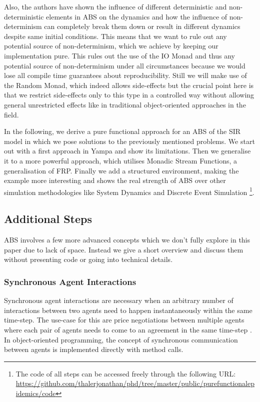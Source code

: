 Also, the authors \cite{thaler_art_2017} have shown the influence of different deterministic and non-deterministic elements in ABS on the dynamics and how the influence of non-determinism can completely break them down or result in different dynamics despite same initial conditions. This means that we want to rule out any potential source of non-determinism, which we achieve by keeping our implementation pure. This rules out the use of the IO Monad and thus any potential source of non-determinism under all circumstances because we would lose all compile time guarantees about reproducibility. Still we will make use of the Random Monad, which indeed allows side-effects but the crucial point here is that we restrict side-effects only to this type in a controlled way without allowing general unrestricted effects like in traditional object-oriented approaches in the field.

In the following, we derive a pure functional approach for an ABS of the SIR model in which we pose solutions to the previously mentioned problems. We start out with a first approach in Yampa and show its limitations. Then we generalise it to a more powerful approach, which utilises Monadic Stream Functions, a generalisation of FRP. Finally we add a structured environment, making the example more interesting and shows the real strength of ABS over other simulation methodologies like System Dynamics and Discrete Event Simulation \footnote{The code of all steps can be accessed freely through the following URL: \url{https://github.com/thalerjonathan/phd/tree/master/public/purefunctionalepidemics/code}}.







\subsection{Additional Steps}
ABS involves a few more advanced concepts which we don't fully explore in this paper due to lack of space. Instead we give a short overview and discuss them without presenting code or going into technical details.

\subsubsection{Synchronous Agent Interactions}
Synchronous agent interactions are necessary when an arbitrary number of interactions between two agents need to happen instantaneously within the same time-step. The use-case for this are price negotiations between multiple agents where each pair of agents needs to come to an agreement in the same time-step \cite{epstein_growing_1996}. In object-oriented programming, the concept of synchronous communication between agents is implemented directly with method calls.

